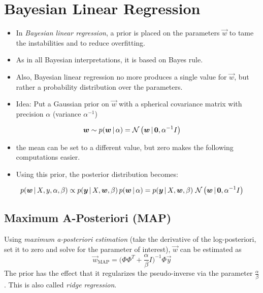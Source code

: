 	\section{Bayesian Linear Regression}
		\begin{itemize}
			\item In \emph{Bayesian linear regression}, a prior is placed on the parameters \(\vec{w}\) to tame the instabilities and to reduce overfitting.
			\item As in all Bayesian interpretations, it is based on Bayes rule.
			\item Also, Bayesian linear regression no more produces a single value for \(\vec{w}\), but rather a probability distribution over the parameters.
			\item Idea: Put a Gaussian prior on \(\vec{w}\) with a spherical covariance matrix with precision \( \alpha \) (variance \(\alpha^{-1}\))
		\end{itemize}
		\begin{equation}
			\bm{w} \sim p(\bm{w} \,\vert\, \alpha) = \mathcal{N}\,\big(\bm{w} \,\vert\, \bm{0}, \alpha^{-1} I\big)
		\end{equation}
		\begin{itemize}
			\item[] the mean can be set to a different value, but zero makes the following computations easier.
			\item Using this prior, the posterior distribution becomes:
		\end{itemize}
		\begin{equation}
			p(\bm{w} \,\vert\, X, y, \alpha, \beta) \propto p(\bm{y} \,\vert\, X, \bm{w}, \beta) \, p(\bm{w} \,\vert\, \alpha) = p(\bm{y} \,\vert\, X, \bm{w}, \beta) \,\,\mathcal{N}\,\big(\bm{w} \,\vert\, \bm{0}, \alpha^{-1} I\big)
		\end{equation}

		\subsection{Maximum A-Posteriori (MAP)}
			Using \emph{maximum a-posteriori estimation} (take the derivative of the log-posteriori, set it to zero and solve for the parameter of interest), \(\vec{w}\) can be estimated as
			\begin{equation}
				\vec{w}_\textrm{MAP} = \Bigg(\! \Phi\Phi^T + \frac{\alpha}{\beta} I \!\Bigg)^{-1} \Phi \vec{y}
			\end{equation}
			The prior has the effect that it regularizes the pseudo-inverse via the parameter \( \frac{\alpha}{\beta} \). This is also called \emph{ridge regression}.

